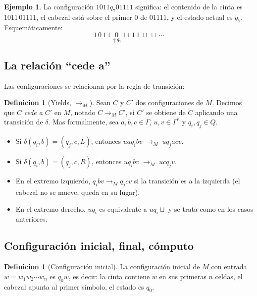 \documentclass[11pt,a4paper]{article}
\theoremstyle{plain}
\theoremstyle{definition}
\newtheorem{definicion}[teorema]{Definicion}
\newtheorem{ejemplo}[teorema]{Ejemplo}
\theoremstyle{remark}
\newcommand{\blank}{\sqcup}
\begin{document}
\begin{ejemplo}
La configuraci\'on $1011 q_7 01111$ significa: el contenido de la cinta es
$1011\,01111$, el cabezal est\'a sobre el primer $0$ de $01111$, y el estado
actual es $q_7$. Esquem\'aticamente:
\[
  \boxed{1}\,\boxed{0}\,\boxed{1}\,\boxed{1}\,\boxed{\underset{\uparrow q_7}{0}}\,\boxed{1}\,\boxed{1}\,\boxed{1}\,\boxed{1}\,\blank\,\blank\,\cdots
\]
\end{ejemplo}

\subsection{La relaci\'on ``cede a''}

Las configuraciones se relacionan por la regla de transici\'on:

\begin{definicion}[Yields, $\to_M$]
\label{def:yields}
Sean $C$ y $C'$ dos configuraciones de $M$. Decimos que $C$ \emph{cede a}
$C'$ en $M$, notado $C\to_M C'$, si $C'$ se obtiene de $C$ aplicando una
transici\'on de $\delta$. Mas formalmente, sea $a,b,c\in\Gamma$,
$u,v\in\Gamma^*$ y $q_i,q_j\in Q$.
\begin{itemize}
  \item Si $\delta(q_i,b)=(q_j,c,L)$, entonces
        \(u a q_i b v \;\to_M\; u q_j a c v.\)
  \item Si $\delta(q_i,b)=(q_j,c,R)$, entonces
        \(u q_i b v \;\to_M\; u c q_j v.\)
  \item En el extremo izquierdo, $q_i b v \to_M q_j c v$ si la transici\'on
        es a la izquierda (el cabezal no se mueve, queda en su lugar).
  \item En el extremo derecho, $u q_i$ es equivalente a $u q_i \blank$ y se
        trata como en los casos anteriores.
\end{itemize}
\end{definicion}

\subsection{Configuraci\'on inicial, final, c\'omputo}

\begin{definicion}[Configuraci\'on inicial]
La configuraci\'on inicial de $M$ con entrada $w=w_1w_2\cdots w_n$ es
$q_0w$, es decir: la cinta contiene $w$ en sus primeras $n$ celdas, el
cabezal apunta al primer s\'imbolo, el estado es $q_0$.
\end{definicion}
\end{document}
